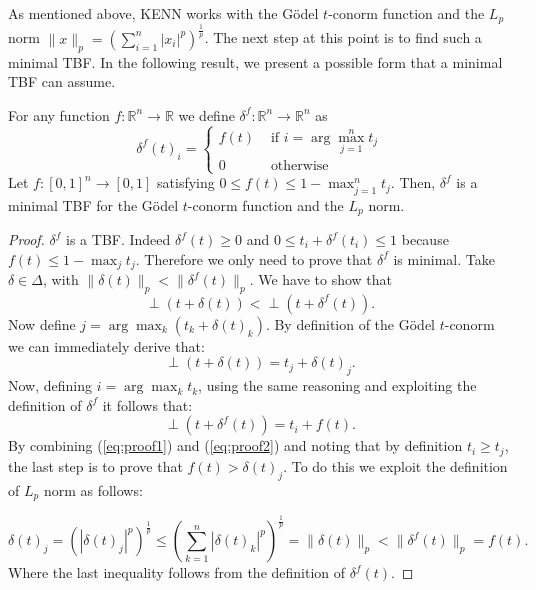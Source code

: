 As mentioned above, KENN works with the Gödel $t$-conorm function and the $L_p$ norm $\|x\|_p = \left( \sum_{i=1}^n |x_i|^p \right)^{\frac{1}{p}}$.
The next step at this point is to find such a minimal TBF. In the following result, we present a possible form that a minimal TBF can assume.

\begin{theorem}
	\label{thm:min_tbf}
	For any function $f: \mathbb{R}^{n} \rightarrow \mathbb{R}$ we define $\delta^{f}: \mathbb{R}^{n} \rightarrow \mathbb{R}^{n}$ as
	$$
	\delta^{f}(t)_{i}= \begin{cases}f(t) & \text { if } i=\arg\max_{j=1}^n t_{j} \\ 0 & \text { otherwise }\end{cases}
	$$
	Let $f: \left[0,1\right]^{n} \rightarrow \left[0,1\right]$ satisfying $0 \leq f(t) \leq 1- \max_{j=1}^n t_j$. Then, $\delta^f$ is a minimal TBF for the Gödel $t$-conorm function and the $L_p$ norm.
\end{theorem}
\begin{proof}
	$\delta^f$ is a TBF. Indeed $\delta^f(t) \geq 0$ and $0 \leq t_i + \delta^f(t_i) \leq 1$ because $f(t) \leq 1- \max_j t_j$. Therefore we only need to prove that $\delta^f$ is minimal. Take $\delta \in \Delta$, with $\|\delta(t)\|_p < \|\delta^f(t)\|_p$. We have to show that $$\perp\left(t+\delta\left(t\right)\right) < \perp\left(t+\delta^f\left(t\right)\right).$$ 
	Now define $j=\arg\max_k \left(t_k + \delta(t)_k\right)$. By definition of the Gödel $t$-conorm we can immediately derive that:
	\begin{equation}
	\perp(t+\delta(t)) = t_j+\delta(t)_j.
	\label{eq:proof1}
	\end{equation}
	Now, defining $i=\arg\max_k t_k$, using the same reasoning and exploiting the definition of $\delta^f$ it follows that:
	\begin{equation}
	\perp(t+\delta^f(t)) = t_i + f(t).
	\label{eq:proof2}
	\end{equation}
	By combining (\ref{eq:proof1}) and (\ref{eq:proof2}) and noting that by definition $t_i \geq t_j$, the last step is to prove that $f(t) > \delta(t)_j$. To do this we exploit the definition of $L_p$ norm as follows:
	
	$$ \delta(t)_j = (|\delta(t)_j|^p)^\frac{1}{p} \leq \left(\sum_{k=1}^{n}|\delta(t)_k|^p \right)^{\frac{1}{p}} = \|\delta(t)\|_p < \|\delta^f(t)\|_p = f(t). $$ 
	Where the last inequality follows from the definition of $\delta^f(t)$.
	
\end{proof}

